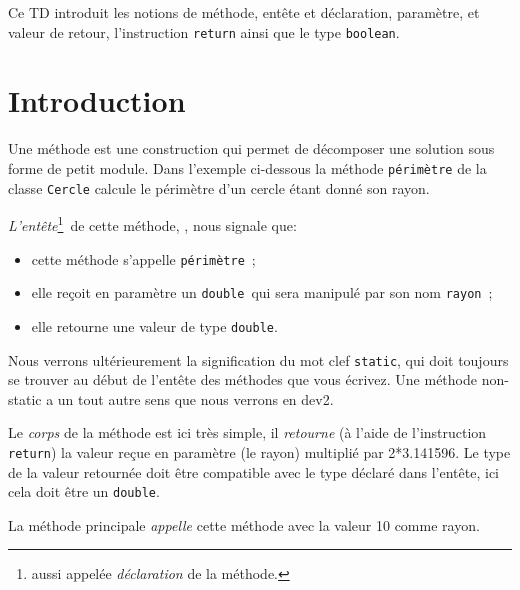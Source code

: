 \documentclass[a4paper,11pt]{article}
\date{2018 -- 2019}
\begin{document}
\entete
\titre
{}
\lastedit


	Ce TD introduit les notions de méthode, entête et déclaration, paramètre, et valeur de retour, l'instruction \texttt{return}
	 ainsi que le type \texttt{boolean}.
	 
	\tableofcontents

	\newpage

\section{Introduction}

	Une méthode est une construction qui permet de décomposer une solution sous forme de petit module.
	Dans l'exemple ci-dessous la méthode \texttt{périmètre} de la classe \texttt{Cercle} calcule le périmètre d'un cercle 
	étant donné son rayon.
	
	

	\emph{L'entête}\footnote{aussi appelée \emph{déclaration} de la méthode. } de cette méthode, ,  nous signale que:
	\begin{itemize}
		\item cette méthode s'appelle \texttt{périmètre}~;
		\item elle reçoit en paramètre un \texttt{double} qui sera manipulé par son nom \texttt{rayon}~;
		\item elle retourne une valeur de type \texttt{double}.
	\end{itemize}
	Nous verrons ultérieurement la signification du mot clef \texttt{static}, qui doit toujours se trouver au début de l'entête des méthodes
	que vous écrivez. Une méthode non-static a un tout autre sens que nous verrons en dev2.

	Le \emph{corps} de la méthode est ici très simple, il \emph{retourne} (à l'aide de l'instruction  \texttt{return})
	 la valeur reçue en paramètre (le rayon) multiplié par 2*3.141596.
	Le type de la valeur retournée doit être compatible avec le type déclaré dans l'entête, 
	ici cela doit être un \texttt{double}.	
	
	La méthode principale \emph{appelle}  cette méthode avec la valeur 10 comme rayon. 
\end{document}
